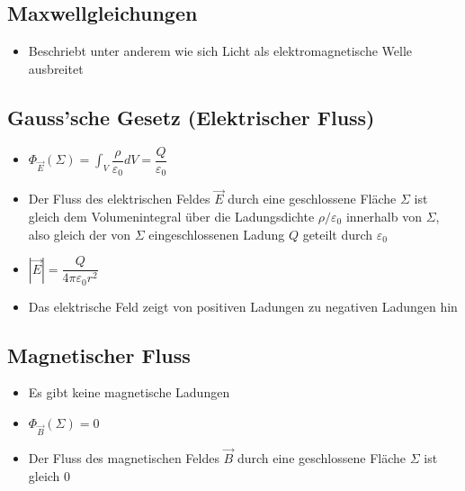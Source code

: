 \documentclass[8pt,a4paper]{scrartcl}
\begin{document}
\begin{multicols*}{3}
			\section{Maxwellgleichungen}
				\begin{itemize}\itemsep0pt
					\item Beschriebt unter anderem wie sich Licht als elektromagnetische Welle ausbreitet
				\end{itemize}				
			
			
				\subsection{Gauss’sche Gesetz (Elektrischer Fluss)}
					\begin{itemize}\itemsep0pt
						\item $\Phi_{\overrightarrow{E}}(\Sigma) = \int_{V}\dfrac{\rho}{\varepsilon_{0}}dV = \dfrac{Q}{\varepsilon_{0}}$
						\item Der Fluss des elektrischen Feldes $\overrightarrow{E}$ durch eine geschlossene Fläche $\Sigma$ ist gleich dem Volumenintegral über die Ladungsdichte $\rho / \varepsilon_{0}$ innerhalb von $\Sigma$, also gleich der von $\Sigma$ eingeschlossenen Ladung $Q$ geteilt durch $\varepsilon_{0}$
						\item $|\overrightarrow{E}| = \dfrac{Q}{4\pi\varepsilon_{0}r^{2}}$
						\item Das elektrische Feld zeigt von positiven Ladungen zu negativen Ladungen hin
					\end{itemize}		
				\subsection{Magnetischer Fluss}
					\begin{itemize}\itemsep0pt
						\item Es gibt keine magnetische Ladungen
						\item $\Phi_{\overrightarrow{B}}(\Sigma) =0$
						\item Der Fluss des magnetischen Feldes $\overrightarrow{B}$ durch eine geschlossene Fläche $\Sigma$ ist gleich 0
					\end{itemize}	

\end{multicols*}
\end{document}
